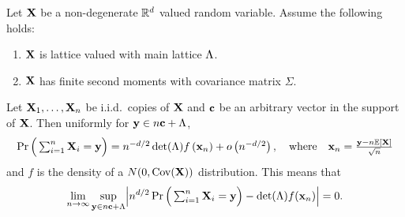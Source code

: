 \begin{theorem}
    \label{thm:normal-multi-llt}
    Let ${\mathbf X}$ be a non-degenerate ${\mathbb R}^d$ valued random variable. Assume the following holds:
    \begin{enumerate}
        \item ${\mathbf X}$ is lattice valued with main lattice $\Lambda$.
        \item ${\mathbf X}$ has finite second moments with covariance matrix $\Sigma$.
    \end{enumerate}
    Let ${\mathbf X}_1, \ldots, {\mathbf X}_n$ be i.i.d.\ copies of ${\mathbf X}$ and ${\mathbf c}$ be an arbitrary vector in the support of ${\mathbf X}$. Then uniformly for ${\mathbf y} \in n{\mathbf c} + \Lambda$,
    \begin{equation*}
        \Pr\Big(
            \textstyle \sum_{i=1}^n {\mathbf X}_i = {\mathbf y}
        \Big)
        = n^{-d/2} \det(\Lambda) f\left( {\mathbf x}_n \right) + o \left( n^{-d/2} \right),
        \quad \text{where} \quad
        {\mathbf x}_n = \frac{{\mathbf y} - n {\mathbb E}[{\mathbf X}]}{\sqrt{n}}
    \end{equation*}
    and $f$ is the density of a $N(0, \operatorname{Cov}({\mathbf X}))$ distribution. This means that
    \begin{equation*}
        \lim_{n \to \infty} \sup_{\vy \in n \vc + \lattice} \abs*{
            n^{d/2} \Pr\Big( \textstyle \sum_{i=1}^n \vX_i = \vy \Big)
            - \det(\lattice) f(\vx_n)
        } = 0.
    \end{equation*}
\end{theorem}